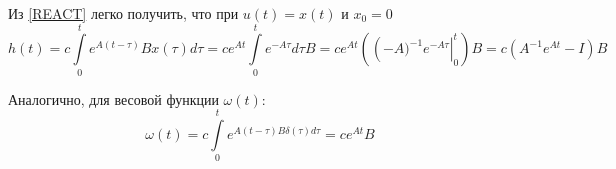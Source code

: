 \documentclass[../../TAU.tex]{subfiles}
\begin{document}

    Из \ref{REACT} легко получить, что при $u(t) = x(t)$ и $x_0 = 0$
    $$
        h(t) = c \int\limits_{0}^{t} e^{A(t-\tau)}Bx(\tau)d\tau = ce^{At} \int\limits_{0}^{t} e^{-A\tau}d\tau B = ce^{At}(\left(-A)^{-1}e^{-A\tau}\right\rvert_0^t)B = c(A^{-1}e^{At}-I)B
    $$

    Аналогично, для весовой функции $\omega(t)$:
    $$
        \omega(t) = c \int\limits_0^t e^{A(t-\tau)B\delta(\tau)d\tau} = ce^{At}B
    $$
\end{document}
